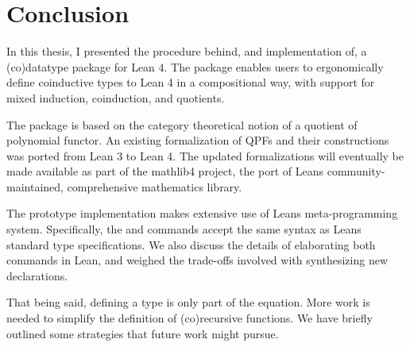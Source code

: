 
\chapter{Conclusion}%
\label{ch:conclusion}

In this thesis, I presented the procedure behind, and implementation of, a (co)datatype package for Lean 4.
The package enables users to ergonomically define coinductive types to Lean 4 in a compositional way,
with support for mixed induction, coinduction, and quotients.

The package is based on the category theoretical notion of a quotient of polynomial functor.
An existing formalization of QPFs and their constructions was ported from Lean 3 to Lean 4.
The updated formalizations will eventually be made available as part of the mathlib4 project, the port of Leans community-maintained, comprehensive mathematics library.

The prototype implementation makes extensive use of Leans meta-programming system.
Specifically, the \data{} and \codata{} commands accept the same syntax as Leans standard \inductive{} type specifications.
We also discuss the details of elaborating both commands in Lean, and weighed the trade-offs involved with 
synthesizing new declarations.



That being said, defining a type is only part of the equation. More work is needed to simplify the definition of (co)recursive functions. We have briefly outlined some strategies that future work might pursue.


